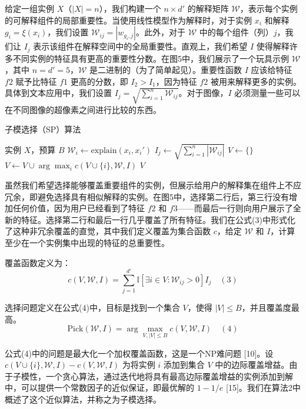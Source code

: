 \documentclass[12pt, a4paper]{ctexart} %
\begin{document}
给定一组实例 \(X\)（\(|X| = n\)），我们构建一个 \(n \times d'\) 的解释矩阵 \(\mathcal{W}\)，表示每个实例的可解释组件的局部重要性。当使用线性模型作为解释时，对于实例 \(x_i\) 和解释 \(g_i = \xi(x_i)\)，我们设置 \(\mathcal{W}_{ij} = |w_{g_i,j}|\)。此外，对于 \(\mathcal{W}\) 中的每个组件（列）\(j\)，我们让 \(I_j\) 表示该组件在解释空间中的全局重要性。直观上，我们希望 \(I\) 使得解释许多不同实例的特征具有更高的重要性分数。在图5中，我们展示了一个玩具示例 \(\mathcal{W}\)，其中 \(n = d' = 5\)，\(\mathcal{W}\) 是二进制的（为了简单起见）。重要性函数 \(I\) 应该给特征 \(f2\) 赋予比特征 \(f1\) 更高的分数，即 \(I_2 > I_1\)，因为特征 \(f2\) 被用来解释更多的实例。具体到文本应用中，我们设置 \(I_j = \sqrt{\sum_{i=1}^{n} \mathcal{W}_{ij}}\)。对于图像，\(I\) 必须测量一些可以在不同图像的超像素之间进行比较的东西。
\begin{algorithm}
    \caption{子模选择（SP）算法}
    \begin{algorithmic}[1]
    \REQUIRE 实例 \(X\)，预算 \(B\)
        \STATE \(\mathcal{W}_i \leftarrow \text{explain}(x_i, x_i')\) 
    \ENDFOR
        \STATE\(I_j \leftarrow \sqrt{\sum_{i=1}^{n} |\mathcal{W}_{ij}|}\) 
    \ENDFOR
    \STATE \(V \leftarrow \{\}\)
        \STATE\(V \leftarrow V \cup \arg\max_i c(V \cup \{i\}, \mathcal{W}, I)\) 
    \ENDWHILE
    \RETURN \(V\)
    \end{algorithmic}
    \end{algorithm}
虽然我们希望选择能够覆盖重要组件的实例，但展示给用户的解释集在组件上不应冗余，即避免选择具有相似解释的实例。在图5中，选择第二行后，第三行没有增加任何价值，因为用户已经看到了特征 \(f2\) 和 \(f3\)——而最后一行则向用户展示了全新的特征。选择第二行和最后一行几乎覆盖了所有特征。我们在公式(3)中形式化了这种非冗余覆盖的直觉，其中我们定义覆盖为集合函数 \(c\)，给定 \(\mathcal{W}\) 和 \(I\)，计算至少在一个实例集中出现的特征的总重要性。

覆盖函数定义为：
\[
c(V, \mathcal{W}, I) = \sum_{j=1}^{d'} \mathbb{I}\left[\exists i \in V : \mathcal{W}_{ij} > 0\right] I_j \quad (3)
\]

选择问题定义在公式(4)中，目标是找到一个集合 \(V\)，使得 \(|V| \leq B\)，并且覆盖度最高。
\[
\text{Pick}(\mathcal{W}, I) = \arg\max_{V, |V| \leq B} c(V, \mathcal{W}, I) \quad (4)
\]

公式(4)中的问题是最大化一个加权覆盖函数，这是一个NP难问题 [10]。设 \(c(V \cup \{i\}, \mathcal{W}, I) - c(V, \mathcal{W}, I)\) 为将实例 \(i\) 添加到集合 \(V\) 中的边际覆盖增益。由于子模性，一个贪心算法，通过迭代地将具有最高边际覆盖增益的实例添加到解中，可以提供一个常数因子的近似保证，即最优解的 \(1 - 1/e\) [15]。我们在算法2中概述了这个近似算法，并称之为子模选择。
\end{document}
